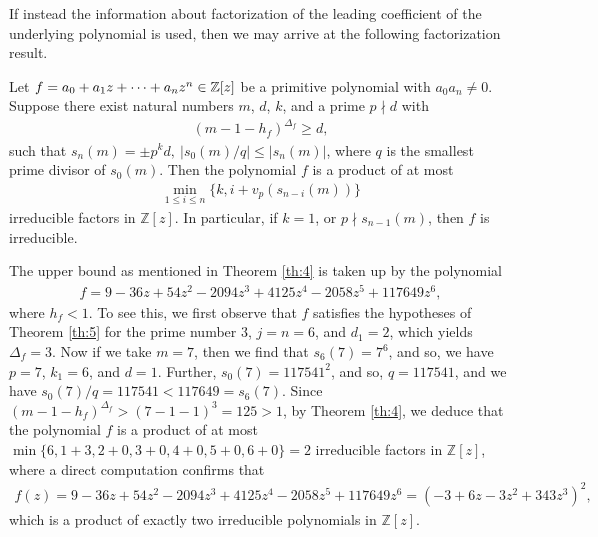 \documentclass[12pt]{amsart}%
\begin{document}
If instead the information about factorization of the leading coefficient of the underlying polynomial is used, then we may arrive at the following factorization result.
\begin{theorem}\label{th:4}
Let $f = a_0 + a_1z +\cdots+a_n z^n\in \Bbb{Z}[z]$ be a primitive polynomial with $a_0a_n\neq 0$.   Suppose there exist natural numbers $m$, $d$, $k$, and a prime $p\nmid d$ with
\begin{eqnarray*}
(m-1-h_f)^{\Delta_f}\geq d,
\end{eqnarray*}
such that $s_n(m)=\pm p^kd,~|s_0(m)/q|\leq |s_n(m)|$, where $q$ is the smallest prime divisor of $s_0(m)$. Then the polynomial $f$ is a product of at most
\begin{eqnarray*}
\min_{1\leq i\leq n}\{k,i+v_p(s_{n-i}(m))\}
\end{eqnarray*}
irreducible factors in $\mathbb{Z}[z]$. In particular, if $k=1$, or $p\nmid s_{n-1}(m)$, then $f$ is irreducible.
\end{theorem}
The upper bound as mentioned in Theorem \ref{th:4} is taken up by the polynomial
\begin{eqnarray*}
f=9-36z+54z^2-2094z^3+4125z^4-2058z^5+117649z^6,
\end{eqnarray*}
where  $h_{f}<1$. To see this, we first observe that $f$ satisfies the hypotheses of Theorem \ref{th:5} for the prime number $3$, $j=n=6$, and $d_1=2$, which yields $\Delta_{f}=3$. Now  if we take $m=7$, then we find that $s_6(7)=7^6$, and so, we have $p=7$, $k_1=6$, and $d=1$. Further, $s_0(7)=117541^2$, and so, $q=117541$, and we have $s_0(7)/q =117541<117649=s_6(7)$. Since  $(m-1-h_{f})^{\Delta_{f}}>(7-1-1)^3=125>1$, by Theorem \ref{th:4}, we deduce that the polynomial $f$ is a product of at most $\min\{6,1+3,2+0,3+0,4+0,5+0,6+0\}=2$ irreducible factors in $\mathbb{Z}[z]$, where a direct computation confirms that
		\begin{eqnarray*}
			f(z)=9-36z+54z^2-2094z^3+4125z^4-2058z^5+117649z^6 = (-3+6z-3z^2+343z^3)^2,
		\end{eqnarray*}
which is a product of exactly two irreducible polynomials in $\mathbb{Z}[z]$.
\end{document}

